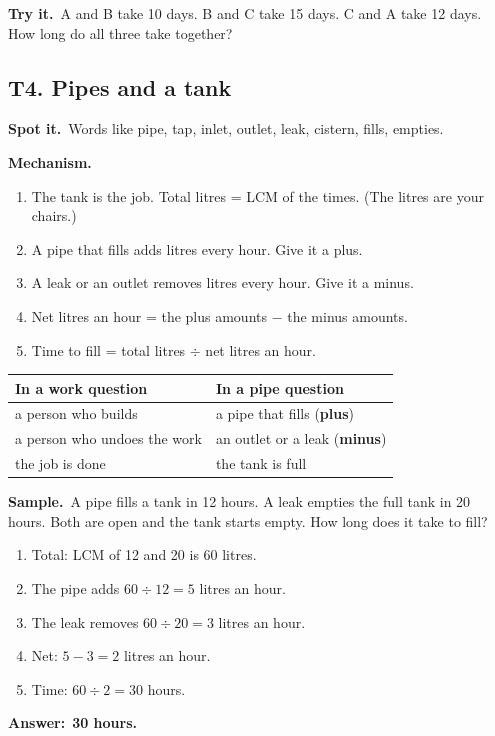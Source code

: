\documentclass[11pt,a4paper]{article}
\let\oldsubsection\subsection
\renewcommand{\subsection}{\needspace{9\baselineskip}\oldsubsection}
\newcommand{\spot}{\textbf{\color{ember}Spot it.}\ }
\newcommand{\mech}{\textbf{\color{ember}Mechanism.}\ }
\newif\ifkeepsamp
\newcommand{\ans}[1]{\par\nopagebreak\noindent\textbf{\color{ember}Answer:}\ \textbf{#1}\par}
\newcommand{\samp}{\ifkeepsamp\needspace{4\baselineskip}\fi\textbf{\color{ember}Sample.}\ }
\newcommand{\tryit}[1]{\textbf{\color{ember}Try it.}\ #1}
\begin{document}
\tryit A and B take 10 days. B and C take 15 days. C and A take 12 days. How long do all three take together?

\subsection{T4. Pipes and a tank}
\spot Words like pipe, tap, inlet, outlet, leak, cistern, fills, empties.

\mech
\begin{enumerate}
\item The tank is the job. Total litres = LCM of the times. (The litres are your chairs.)
\item A pipe that fills adds litres every hour. Give it a plus.
\item A leak or an outlet removes litres every hour. Give it a minus.
\item Net litres an hour = the plus amounts $-$ the minus amounts.
\item Time to fill = total litres $\div$ net litres an hour.
\end{enumerate}

\begin{center}\small\renewcommand{\arraystretch}{1.18}\setlength{\tabcolsep}{9pt}
\begin{tabular}{@{}ll@{}}
\toprule
\textbf{\color{slate}In a work question} & \textbf{\color{slate}In a pipe question} \\ \midrule
a person who builds & a pipe that fills (\textbf{plus}) \\
a person who undoes the work & an outlet or a leak (\textbf{minus}) \\
the job is done & the tank is full \\
\bottomrule
\end{tabular}\end{center}

\samp A pipe fills a tank in 12 hours. A leak empties the full tank in 20 hours. Both are open and the tank starts empty. How long does it take to fill?
\begin{enumerate}
\item Total: LCM of 12 and 20 is 60 litres.
\item The pipe adds $60 \div 12 = 5$ litres an hour.
\item The leak removes $60 \div 20 = 3$ litres an hour.
\item Net: $5 - 3 = 2$ litres an hour.
\item Time: $60 \div 2 = 30$ hours.
\end{enumerate}
\ans{30 hours.}
\end{document}
